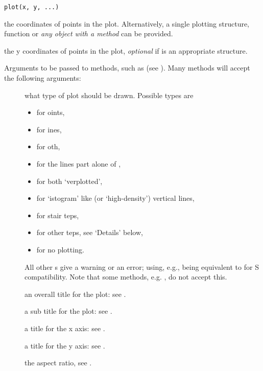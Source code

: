 %
\begin{Usage}
\begin{verbatim}
plot(x, y, ...)
\end{verbatim}
\end{Usage}
%
\begin{Arguments}
\begin{ldescription}
\item[\code{x}] the coordinates of points in the plot. Alternatively, a
single plotting structure, function or \emph{any \R{} object with a
 method} can be provided.
\item[\code{y}] the y coordinates of points in the plot, \emph{optional}
if  is an appropriate structure.
\item[\code{...}] Arguments to be passed to methods, such as
 (see ).
Many methods will accept the following arguments:
\begin{description}

\item[] what type of plot should be drawn.  Possible types are
\begin{itemize}

\item {} for oints,
\item {} for ines,
\item {} for oth,
\item {} for the lines part alone of ,
\item {} for both `verplotted',
\item {} for `istogram' like (or
`high-density') vertical lines,
\item {} for stair teps,
\item {} for other teps, see `Details' below,
\item {} for no plotting.

\end{itemize}

All other s give a warning or an error; using, e.g.,
 being equivalent to  for S
compatibility.  Note that some methods,
e.g. , do not accept this.

\item[] an overall title for the plot: see .
\item[] a sub title for the plot: see .
\item[] a title for the x axis: see .
\item[] a title for the y axis: see .
\item[] the  aspect ratio,
see .

\end{description}


\end{ldescription}
\end{Arguments}
